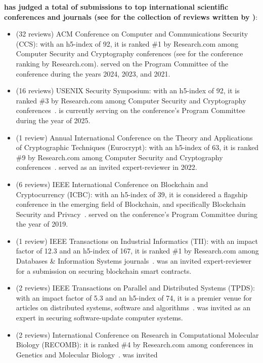 \textbf{\dr has judged a total of \numreviews submissions to top international
scientific conferences and journals (see  for the collection of
reviews written by \dr)}:
\begin{itemize}
	\item (32 reviews) ACM Conference on Computer and Communications 
	Security (CCS): with an h5-index of 92, it is ranked \#1 by Research.com 
	among Computer Security and Cryptography conferences (see 
	for the conference ranking by Research.com). \dr served on the Program
	Committee of the conference during the years 2024, 2023, and 2021.
	\item (16 reviews) USENIX Security Symposium: with an h5-index of 92, it is 
	ranked \#3 by Research.com among Computer Security and Cryptography 
	conferences~\cite{venues}. \dr is currently serving on the conference's
	Program Committee during the year of 2025.
	\item (1 review) Annual International Conference on the Theory 
	and Applications of Cryptographic Techniques (Eurocrypt): with an h5-index of 63, it is ranked \#9 by Research.com among Computer Security and 
	Cryptography conferences~\cite{venues}. \dr served as an invited expert-reviewer in 2022.
	\item (6 reviews) IEEE International Conference on Blockchain and 
	Cryptocurrency (ICBC): with an h5-index of 39, it is considered a flagship 
	conference in the emerging field of Blockchain, and specifically Blockchain 
	Security and Privacy~\cite{venues}. \dr served on the conference's Program
	Committee during the year of 2019.
	\item (1 review) IEEE Transactions on Industrial Informatics (TII): with an 
	impact factor of 12.3 and an h5-index of 167, it is ranked \#1 by 
	Research.com among Databases \& Information Systems journals~\cite{venues}.
	\dr was an invited expert-reviewer for a submission on securing blockchain 
	smart contracts.
	\item (2 reviews) IEEE Transactions on Parallel and Distributed Systems 
	(TPDS): with an impact factor of 5.3 and an h5-index of 74, it is a premier 
	venue for articles on distributed systems, software and
	algorithms~\cite{venues}. \dr was invited as an expert in securing
	software-update computer systems.
	\item (2 reviews) International Conference on Research in Computational 
	Molecular Biology (RECOMB): it is ranked \#4 by Research.com among 
	conferences in Genetics and Molecular Biology~\cite{venues}. \dr was invited

\end{itemize}
